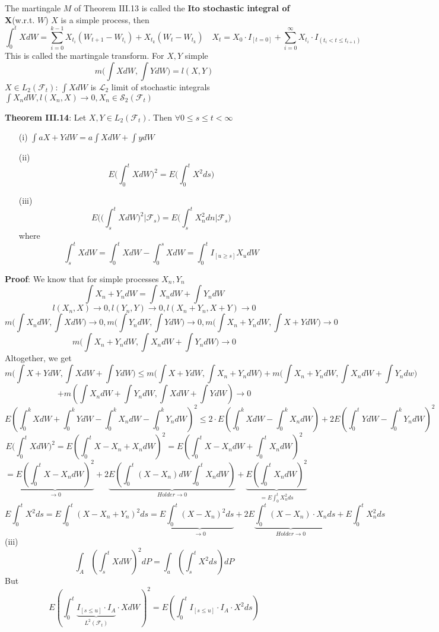 \documentclass[english]{article}
\newcommand{\ub}{\underbrace}
\newcommand{\note}[1]{\noindent\textbf{#1}}
\newcommand{\F}{\mathcal F}
\begin{document}
The martingale $M$ of Theorem III.13 is called the \textbf{Ito stochastic integral of X}(w.r.t. $W$) \newline
$X$ is a simple process, then
$$\int^t_0 X dW = \sum^{k-1}_{i=0} X_{t_i} (W_{t+1} - W_{t_i}) + X_{t_k} (W_t - W_{t_k}) \quad X_t = X_0 \cdot I_{[t=0]} + \sum^\infty_{i=0} X_{t_i} \cdot I_{(t_i < t \leq t_{i+1})}$$
This is called the martingale transform. \newline
For $X,Y$ simple 
$$m\Big(\int X dW, \int Y dW \Big) = l(X,Y)$$
$X \in L_2(\F_t)$: $\int X dW$ is $\mathcal L_2$ limit of stochastic integrals $\int X_n dW, l (X_n, X)\to 0, X_n \in \mathcal S_2(\F_t)$ \;

\note{Theorem III.14}: Let $X,Y \in L_2(\F_t)$. Then $\forall 0 \leq s \leq t < \infty$ \begin{enumerate}
\item[(i)] $ \int aX + Y dW = a\int XdW + \int y dW$
\item[(ii)] $$E\Big(\int^t_0 X dW\Big)^2 = E\Big(\int^t_0 X^2 ds \Big)$$
\item[(iii)] $$E\Big(\big(\int^t_s X dW\big)^2 \Big| \F_s \Big) = E \Big(\int^t_s X_n^2 dn \Big|\F_s \Big)$$ where $$\int^t_s X dW = \int^t_0 XdW - \int^s_0 XdW = \int^t_0 I_{[u\geq s]} X_u dW$$
\end{enumerate}
\note{Proof}: We know  that for simple processes $X_n, Y_n$
$$\int X_n + Y_n dW = \int X_n dW + \int Y_n dW$$
$$l(X_n, X) \to 0, l(Y_n, Y) \to 0, l(X_n+ Y_n, X +Y) \to 0$$
$$m\big( \int X_n dW, \int X dW \big) \to 0, m\big( \int Y_n dW, \int Y dW \big) \to 0, m\big( \int X_n + Y_n dW, \int X+Y dW \big) \to 0$$
$$m\big( \int X_n +Y_n dW, \int X_n dW + \int Y_n dW \big) \to 0$$
Altogether, we get
$$m\big( \int X + Y dW, \int X dW + \int Y dW \big) \leq m\big( \int X + Y dW, \int X_n + Y_n dW \big) + m\big( \int X_n + Y_n dW, \int X_n dW + \int Y_n dw \big) $$
$$+m(\int X_n dW + \int Y_n dW, \int X dW + \int Y dW) \to 0$$
$$E( \int^k_0 X dW + \int^k_0 Y dW - \int^k_0 X_n dW - \int^k_0 Y_n dW)^2 \leq 2 \cdot E(\int^k_0 X dW - \int^k_0 X_n dW) + 2 E(\int^t_0 Y dW - \int^k_0 Y_n dW)^2$$
$$E\Big(\int^t_0 X dW \Big)^2 = E(\int^t_0 X-X_n + X_n dW)^2 = E(\int^t_0 X - X_n dW + \int^t_0 X_n dW)^2$$
$$=\ub{E(\int^t_0 X- X_n dW)^2}_{\to 0} + 2 \ub{E( \int^t_0 (X- X_n) dW \int^t_0 X_n dW)}_{Holder \to 0} + \ub{E(\int^t_0 X_n dW)^2}_{= E\int^t_0 X_n^2 ds}$$
$$E\int^t_0 X^2 ds = E \int^t_0 (X- X_n + Y_n)^2 ds = E\ub{\int^t_0 (X-X_n)^2 ds}_{\to 0} + 2 E\ub{ \int^t_0 (X - X_n) \cdot X_n}_{Holder \to 0} ds + E\int^t_0 X_n^2 ds$$  
(iii)
$$\int_A (\int^t_s X dW)^2 dP = \int_a (\int^t_s X^2 ds) dP$$
But
$$E(\int^t_0 \ub{I_{[s\leq u]} \cdot I_A}_{L^2(\F_t)} \cdot X dW)^2 = E(\int^t_0 I_{[s\leq u]} \cdot I_A \cdot X^2 ds)$$
\end{document}
